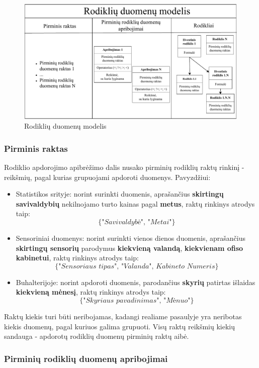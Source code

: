 \documentclass{VUMIFPSbakalaurinis}
\begin{document}
\begin{figure}[H]
    \includegraphics[width=1\textwidth]{img/rodiklio_modelis.pdf}
    \caption{Rodiklių duomenų modelis}
    \label{img:rodiklio_apibrezimas}
\end{figure}

\subsubsection{Pirminis raktas}

Rodiklio apdorojimo apibrėžimo dalis nusako pirminių rodiklių raktų rinkinį - reikšmių, pagal kurias grupuojami apdoroti duomenys. Pavyzdžiui:
\begin{itemize}
    \item Statistikos srityje: norint surinkti duomenis, aprašančius \textbf{skirtingų savivaldybių} nekilnojamo turto kainas pagal \textbf{metus}, raktų rinkinys atrodys taip: \[\{\textit{"Savivaldybė", "Metai"}\}\]
    \item Sensoriniai duomenys: norint surinkti vienos dienos duomenis, aprašančius \textbf{skirtingų sensorių} parodymus \textbf{kiekvieną valandą}, \textbf{kiekvienam ofiso kabinetui}, raktų rinkinys atrodys taip: \[\{\textit{"Sensoriaus tipas", "Valanda", Kabineto Numeris}\}\] 
    \item Buhalterijoje: norint apdoroti duomenis, parodančius \textbf{skyrių} patirtas išlaidas \textbf{kiekvieną mėnesį}, raktų rinkinys atrodys taip: \[\{\textit{"Skyriaus pavadinimas", "Mėnuo"}\}\] 
\end{itemize}  \par
Raktų kiekis turi būti neribojamas, kadangi realiame pasaulyje yra neribotas kiekis duomenų, pagal kuriuos galima grupuoti. Visų raktų reikšmių kiekių sandauga - apdorotų rodiklių duomenų pirminių raktų aibė. 

\subsubsection{Pirminių rodiklių duomenų apribojimai}
\end{document}

